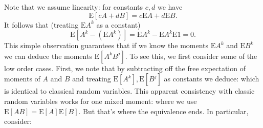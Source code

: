 Note that we assume linearity: for constants $c,d$ we have
\[
\ensuremath{\bm{\mathrm{E}}}[c A + d B] = c \ensuremath{\bm{\mathrm{E}}}  A + d \ensuremath{\bm{\mathrm{E}}} B.
\]
It follows that (treating $\ensuremath{\bm{\mathrm{E}}}A^k$ as a constant)
\[
\ensuremath{\bm{\mathrm{E}}}[A^k - (\ensuremath{\bm{\mathrm{E}}}A^k)] =  \ensuremath{\bm{\mathrm{E}}} A^k - \ensuremath{\bm{\mathrm{E}}}A^k \ensuremath{\bm{\mathrm{E}}}1  = 0.
\]
This simple observation guarantees that if we know the moments $\ensuremath{\bm{\mathrm{E}}} A^k$ and $\ensuremath{\bm{\mathrm{E}}} B^k$ we can deduce the moments $\ensuremath{\bm{\mathrm{E}}}[A^k B^j]$. To see this, we first consider some of the low order cases. First, we note that by subtracting off the free expectation of moments of $A$ and $B$ and treating $\ensuremath{\bm{\mathrm{E}}}[A^k], \ensuremath{\bm{\mathrm{E}}}[B^j]$ as constants we deduce:
which is identical to classical random variables. This apparent consistency with classic random variables works for one mixed moment:
where we use $\ensuremath{\bm{\mathrm{E}}}[AB] = \ensuremath{\bm{\mathrm{E}}}[A] \ensuremath{\bm{\mathrm{E}}}[B]$.  But that's where the equivalence ends. In particular, consider:
